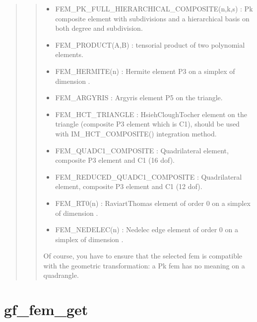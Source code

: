 \documentclass[a4paper,11pt,english]{sphinxmanual}
\begin{document}
\begin{quote}
\begin{quote}
\begin{itemize}
\item {} 
FEM\_PK\_FULL\_HIERARCHICAL\_COMPOSITE(n,k,s) :
Pk composite element with  subdivisions and a hierarchical basis
on both degree and subdivision.

\item {} 
FEM\_PRODUCT(A,B) :
tensorial product of two polynomial elements.

\item {} 
FEM\_HERMITE(n) :
Hermite element P3 on a simplex of dimension .

\item {} 
FEM\_ARGYRIS :
Argyris element P5 on the triangle.

\item {} 
FEM\_HCT\_TRIANGLE :
Hsieh\sphinxhyphen{}Clough\sphinxhyphen{}Tocher element on the triangle (composite P3 element
which is C1), should be used with IM\_HCT\_COMPOSITE() integration
method.

\item {} 
FEM\_QUADC1\_COMPOSITE :
Quadrilateral element, composite P3 element and C1 (16 dof).

\item {} 
FEM\_REDUCED\_QUADC1\_COMPOSITE :
Quadrilateral element, composite P3 element and C1 (12 dof).

\item {} 
FEM\_RT0(n) :
Raviart\sphinxhyphen{}Thomas element of order 0 on a simplex of dimension .

\item {} 
FEM\_NEDELEC(n) :
Nedelec edge element of order 0 on a simplex of dimension .

\end{itemize}

Of course, you have to ensure that the selected fem is compatible with
the geometric transformation: a Pk fem has no meaning on a quadrangle.
\end{quote}
\end{quote}


\section{gf\_fem\_get}
\label{\detokenize{matlab_octave/cmdref_gf_fem_get:gf-fem-get}}\label{\detokenize{matlab_octave/cmdref_gf_fem_get::doc}}
\end{document}
